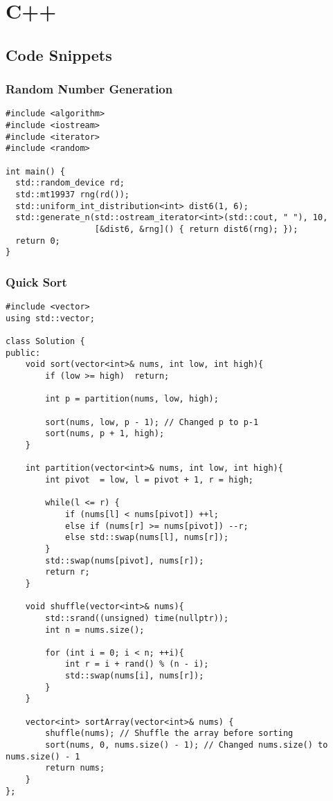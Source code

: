 \chapter{C++}\label{chp:c++}
\minitoc


\section{Code Snippets}

\subsection{Random Number Generation}

\begin{verbatim}
#include <algorithm>
#include <iostream>
#include <iterator>
#include <random>

int main() {
  std::random_device rd;
  std::mt19937 rng(rd());
  std::uniform_int_distribution<int> dist6(1, 6);
  std::generate_n(std::ostream_iterator<int>(std::cout, " "), 10,
                  [&dist6, &rng]() { return dist6(rng); });
  return 0;
}
\end{verbatim}


\subsection{Quick Sort}

\begin{verbatim}
#include <vector>
using std::vector;

class Solution {
public:
    void sort(vector<int>& nums, int low, int high){
        if (low >= high)  return;

        int p = partition(nums, low, high);

        sort(nums, low, p - 1); // Changed p to p-1
        sort(nums, p + 1, high);
    }

    int partition(vector<int>& nums, int low, int high){
        int pivot  = low, l = pivot + 1, r = high;

        while(l <= r) {
            if (nums[l] < nums[pivot]) ++l;
            else if (nums[r] >= nums[pivot]) --r;
            else std::swap(nums[l], nums[r]);
        }
        std::swap(nums[pivot], nums[r]);
        return r;
    }

    void shuffle(vector<int>& nums){
        std::srand((unsigned) time(nullptr));
        int n = nums.size();

        for (int i = 0; i < n; ++i){
            int r = i + rand() % (n - i);
            std::swap(nums[i], nums[r]);
        }
    }

    vector<int> sortArray(vector<int>& nums) {
        shuffle(nums); // Shuffle the array before sorting
        sort(nums, 0, nums.size() - 1); // Changed nums.size() to nums.size() - 1
        return nums;
    }
};
\end{verbatim}

